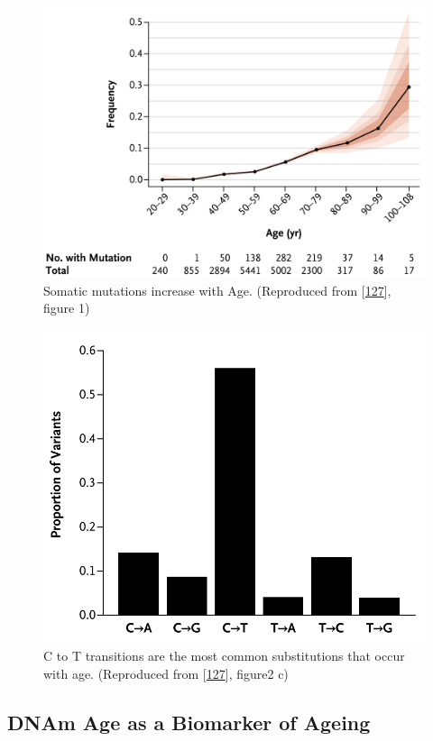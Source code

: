 \documentclass[
]{book}
\begin{document}
\begin{figure}

{\centering \includegraphics[width=0.6\linewidth]{figs/Jaiswal2014fig1_somaticMutationAge} 

}

\caption{Somatic mutations increase with Age. (Reproduced from {[}\protect\hyperlink{ref-Jaiswal2014c}{127}{]}, figure 1)}\label{fig:Jaiswal2014fig1}
\end{figure}



\begin{figure}

{\centering \includegraphics[width=0.6\linewidth]{figs/Jaiswal2014fig2c} 

}

\caption{C to T transitions are the most common substitutions that occur with age. (Reproduced from {[}\protect\hyperlink{ref-Jaiswal2014c}{127}{]}, figure2 c)}\label{fig:Jaiswal2014fig2c}
\end{figure}



\hypertarget{dnam-age-as-a-biomarker-of-ageing}{%
\subsection{DNAm Age as a Biomarker of Ageing}\label{dnam-age-as-a-biomarker-of-ageing}}
\end{document}
